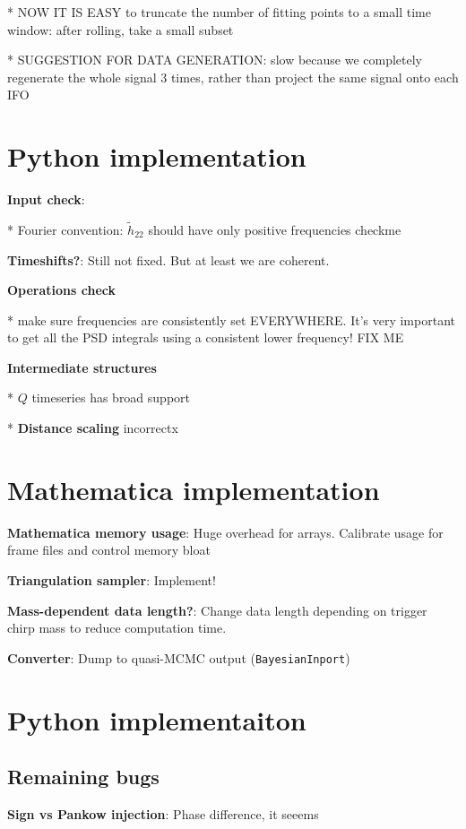 \documentclass[twocolumn,prd,nofootinbib]{revtex4}
\newcommand\editremark[1]{{\color{red} #1}}
\begin{document}
* NOW IT IS EASY to truncate the number of fitting points to a small time window: after rolling, take a small subset

* SUGGESTION FOR DATA GENERATION: slow because we completely regenerate the whole signal 3 times, rather than
  project the same signal onto each IFO

\section{Python implementation}

\noindent \textbf{Input check}: 

* Fourier convention: $\tilde{h}_{22}$ should have only positive frequencies \editremark{checkme}

\noindent \textbf{Timeshifts?}: Still not fixed. But at least we are coherent.


\noindent \textbf{Operations check}

* make sure frequencies are consistently set EVERYWHERE.  It's very important to get all the PSD integrals using a
consistent lower frequency! \editremark{FIX ME}

\noindent \textbf{Intermediate structures}



* $Q$ timeseries has broad support

* \textbf{Distance scaling} incorrectx

\section{Mathematica implementation}

\noindent \textbf{Mathematica memory usage}: Huge overhead for arrays.  Calibrate usage for frame files and control
memory bloat

\noindent \textbf{Triangulation sampler}: Implement!

\noindent \textbf{Mass-dependent data length?}: Change data length depending on trigger chirp mass to reduce computation time.


\noindent \textbf{Converter}: Dump to quasi-MCMC output (\texttt{BayesianInport})

\section{Python implementaiton}



\subsection{Remaining bugs}
\noindent \textbf{Sign vs Pankow injection}: Phase difference, it seeems
\end{document}
